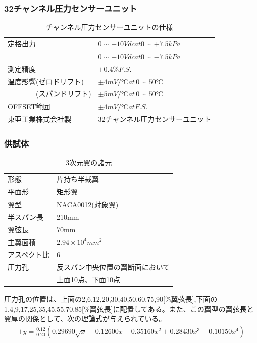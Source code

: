 \documentclass[a4j,twoside,openright,11pt]{jarticle}
\begin{document}
\newpage
\subsubsection{32チャンネル圧力センサーユニット}
\begin{table}[htbp]
\begin{center}
  \caption{チャンネル圧力センサーユニットの仕様}
  \begin{tabular}{ll} \hline
定格出力                &$0 \sim +10Vdc at 0 \sim +7.5 kPa$\\
                        &$0 \sim -10Vdc at 0 \sim -7.5 kPa$\\
測定精度                &$\pm0.4\%F.S.$\\
温度影響(ゼロドリフト)  &$\pm 4mV/℃ at \,0 \sim 50 ℃ $\\
\,\,\,\,\,\,\,\,\,\,\,\,\,\,\,\,\,\,\,\,\,\,\,\,(スパンドリフト)&$\pm 5mV/℃ at \,0 \sim 50 ℃ $\\
OFFSET範囲              &$\pm 4mV/℃  atF.S. $\\
東亜工業株式会社製      &32チャンネル圧力センサーユニット\\
\hline
  \end{tabular}
\end{center}
\end{table}

\subsubsection{供試体}

\begin{table}[htb]
\begin{center}
  \caption{3次元翼の諸元}
  \begin{tabular}{ll} \hline
形態&片持ち半裁翼\\
平面形&矩形翼\\
翼型&NACA0012(対象翼)\\
半スパン長&210mm\\
翼弦長&70mm\\
主翼面積&$2.94 \times 10^{4}mm^2$\\
アスペクト比&6\\
圧力孔&反スパン中央位置の翼断面において\\
&上面10点、下面10点\\
\hline
  \end{tabular}
\end{center}
\end{table}
圧力孔の位置は、上面の2,6,12,20,30,40,50,60,75,90[\%翼弦長],下面の1,4,9,17,25,35,45,55,70,85[\%翼弦長]に配置してある。また、この翼型の翼弦長と翼厚の関係として、次の理論式が与えられている。
\begin{eqnarray}
\pm y = \frac{0.12}{0.20}\left(0.29690\sqrt{x} -0.12600x -0.35160x^2 +0.28430x^3 -0.10150x^4 \right)
\end{eqnarray}
\end{document}
